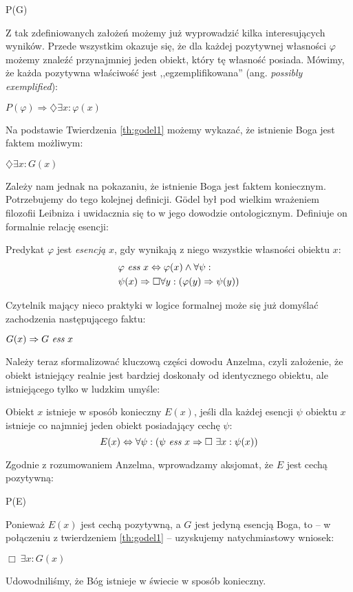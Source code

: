 \documentclass[
    showauthor=true,   %
    showsubject=false, %
    showdate=true,     %
    hyphenation=true   %
]{src/wut-report}
\begin{document}
\begin{axiom} \label{axiom:godel4}
	P(G)
\end{axiom}
Z tak zdefiniowanych założeń możemy już wyprowadzić kilka interesujących wyników. Przede wszystkim okazuje się, że dla każdej pozytywnej własności $\varphi$ możemy znaleźć przynajmniej jeden obiekt, który tę własność posiada. Mówimy, że każda pozytywna właściwość jest ,,egzemplifikowana'' (ang. \emph{possibly exemplified}):
\begin{theorem} \label{th:godel1}
	$P(\varphi) \Rightarrow \diamondsuit \exists x: \varphi(x)$
\end{theorem}
Na podstawie Twierdzenia \ref{th:godel1} możemy wykazać, że istnienie Boga jest faktem możliwym:
\begin{theorem} \label{th:godel2}
	$\diamondsuit \exists x: G(x)$
\end{theorem}
Zależy nam jednak na pokazaniu, że istnienie Boga jest faktem koniecznym. Potrzebujemy do tego kolejnej definicji. G\"odel był pod wielkim wrażeniem filozofii Leibniza i uwidacznia się to w jego dowodzie ontologicznym. Definiuje on formalnie relację esencji:
\begin{definition}
	Predykat $\varphi$ jest \emph{esencją} $x$, gdy wynikają z niego wszystkie własności obiektu $x$:
	\begin{align*}
	& \varphi\ \emph{ess}\ x \Leftrightarrow \varphi(x) \wedge \forall \psi: \\
	& \psi(x) \Rightarrow \Box \forall y: \left( \varphi(y) \Rightarrow \psi(y) \right)
	\end{align*}
\end{definition}
Czytelnik mający nieco praktyki w logice formalnej może się już domyślać zachodzenia następującego faktu:
\begin{corollary}
	$G(x) \Rightarrow G\ \emph{ess}\ x$
\end{corollary}
Należy teraz sformalizować kluczową części dowodu Anzelma, czyli założenie, że obiekt istniejący realnie jest bardziej doskonały od identycznego obiektu, ale istniejącego tylko w ludzkim umyśle:
\begin{definition}
	Obiekt $x$ istnieje w sposób konieczny $E(x)$, jeśli dla każdej esencji $\psi$ obiektu $x$ istnieje co najmniej jeden obiekt posiadający cechę $\psi$:
	\begin{equation*}
	E(x) \Leftrightarrow \forall \psi: \left( \psi\ \emph{ess}\ x \Rightarrow\Box\ \exists x: \psi(x) \right)
	\end{equation*}
\end{definition}
Zgodnie z rozumowaniem Anzelma, wprowadzamy aksjomat, że $E$ jest cechą pozytywną:
\begin{axiom}
	P(E)
\end{axiom}
Ponieważ $E(x)$ jest cechą pozytywną, a $G$ jest jedyną esencją Boga, to -- w połączeniu z twierdzeniem \ref{th:godel1} -- uzyskujemy natychmiastowy wniosek:
\begin{theorem} \label{th:goedel3}
	$\Box\ \exists x: G(x)$
\end{theorem}
Udowodniliśmy, że Bóg istnieje w świecie w sposób konieczny.
\end{document}
